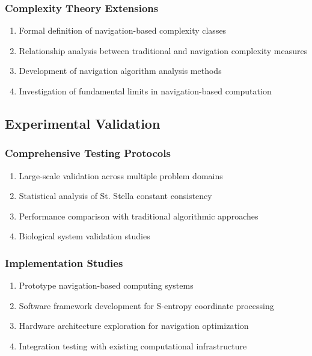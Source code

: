 \documentclass[12pt,a4paper]{article}
\begin{document}
\subsubsection{Complexity Theory Extensions}

\begin{enumerate}
\item Formal definition of navigation-based complexity classes
\item Relationship analysis between traditional and navigation complexity measures
\item Development of navigation algorithm analysis methods
\item Investigation of fundamental limits in navigation-based computation
\end{enumerate}

\subsection{Experimental Validation}

\subsubsection{Comprehensive Testing Protocols}

\begin{enumerate}
\item Large-scale validation across multiple problem domains
\item Statistical analysis of St. Stella constant consistency
\item Performance comparison with traditional algorithmic approaches
\item Biological system validation studies
\end{enumerate}

\subsubsection{Implementation Studies}

\begin{enumerate}
\item Prototype navigation-based computing systems
\item Software framework development for S-entropy coordinate processing
\item Hardware architecture exploration for navigation optimization
\item Integration testing with existing computational infrastructure
\end{enumerate}
\end{document}
